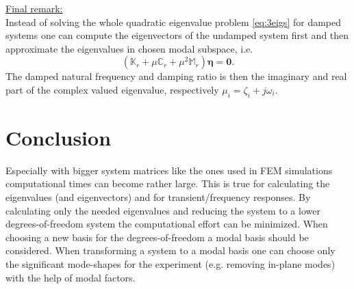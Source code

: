 \documentclass[conference]{journal}
\newcommand{\bb}[1]{\mathbb{#1}}
\newcommand{\B}[1]{\mathbf{#1}}
\newcommand{\Beta}{\boldsymbol{\eta}}
\begin{document}
	\underline{Final remark:}\\ Instead of solving the whole quadratic eigenvalue problem \eqref{eq:3eigs} for damped systems one can compute the eigenvectors of the undamped system first and then approximate the eigenvalues in chosen modal subspace, i.e.
	\begin{equation}
	(\bb{K}_r + \mu \bb{C}_r + \mu^2 \bb{M}_r) \Beta = \B{0}.
	\end{equation}  
	The damped natural frequency and damping ratio is then the imaginary and real part of the complex valued eigenvalue, respectively $\mu_i = \zeta_i + j \omega_i$.
	\section{Conclusion}
	Especially with bigger system matrices like the ones used in FEM simulations computational times can become rather large. This is true for calculating the eigenvalues (and eigenvectors) and for transient/frequency responses. By calculating only the needed eigenvalues and reducing the system to a lower degrees-of-freedom system the computational effort can be minimized. When choosing a new basis for the degrees-of-freedom a modal basis should be considered. When transforming a system to a modal basis one can choose only the significant mode-shapes for the experiment (e.g. removing in-plane modes) with the help of modal factors. 
	
	
\end{document}
